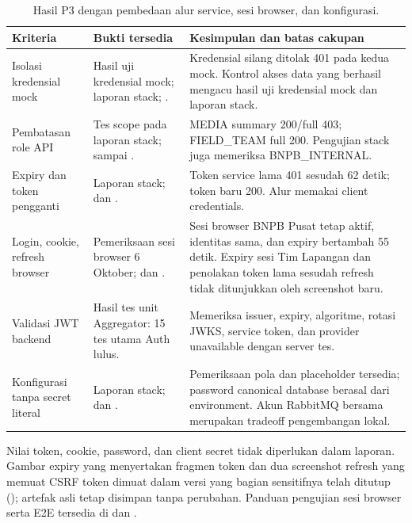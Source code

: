 \begin{table}[H]\small
\begin{tabularx}{\textwidth}{@{}P{3.3cm}YY@{}}
\toprule \textbf{Kriteria} & \textbf{Bukti tersedia} & \textbf{Kesimpulan dan batas cakupan}\\\midrule
Isolasi kredensial mock & Hasil uji kredensial mock; laporan stack; . & Kredensial silang ditolak 401 pada kedua mock. Kontrol akses data yang berhasil mengacu hasil uji kredensial mock dan laporan stack.\\
Pembatasan role API & Tes scope pada laporan stack;  sampai . & MEDIA summary 200/full 403; FIELD\_TEAM full 200. Pengujian stack juga memeriksa BNPB\_INTERNAL.\\
Expiry dan token pengganti & Laporan stack;  dan . & Token service lama 401 sesudah 62 detik; token baru 200. Alur memakai client credentials.\\
Login, cookie, refresh browser & Pemeriksaan sesi browser 6 Oktober;  dan . & Sesi browser BNPB Pusat tetap aktif, identitas sama, dan expiry bertambah 55 detik. Expiry sesi Tim Lapangan dan penolakan token lama sesudah refresh tidak ditunjukkan oleh screenshot baru.\\
Validasi JWT backend & Hasil tes unit Aggregator: 15 tes utama Auth lulus. & Memeriksa issuer, expiry, algoritme, rotasi JWKS, service token, dan provider unavailable dengan server tes.\\
Konfigurasi tanpa secret literal & Laporan stack;  dan . & Pemeriksaan pola dan placeholder tersedia; password canonical database berasal dari environment. Akun RabbitMQ bersama merupakan tradeoff pengembangan lokal.\\\bottomrule
\end{tabularx}
\caption{Hasil P3 dengan pembedaan alur service, sesi browser, dan konfigurasi.}
\end{table}

Nilai token, cookie, password, dan client secret tidak diperlukan dalam laporan. Gambar expiry yang menyertakan fragmen token dan dua screenshot refresh yang memuat CSRF token dimuat dalam versi yang bagian sensitifnya telah ditutup (); artefak asli tetap disimpan tanpa perubahan. Panduan pengujian sesi browser serta E2E tersedia di  dan .
